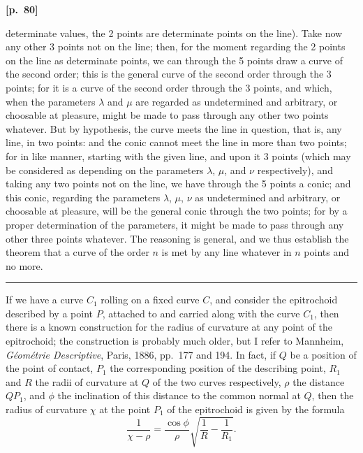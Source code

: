 \documentclass[11pt,a4paper]{book}
\begin{document}
\vspace{0.5em}
\noindent\textbf{[p.\ 80]}

determinate values, the 2 points are determinate points on the line). Take now any other 3 points not on the line; then, for the moment regarding the 2 points on the line as determinate points, we can through the 5 points draw a curve of the second order; this is the general curve of the second order through the 3 points; for it is a curve of the second order through the 3 points, and which, when the parameters $\lambda$ and $\mu$ are regarded as undetermined and arbitrary, or choosable at pleasure, might be made to pass through any other two points whatever. But by hypothesis, the curve meets the line in question, that is, any line, in two points: and the conic cannot meet the line in more than two points; for in like manner, starting with the given line, and upon it 3 points (which may be considered as depending on the parameters $\lambda$, $\mu$, and $\nu$ respectively), and taking any two points not on the line, we have through the 5 points a conic; and this conic, regarding the parameters $\lambda$, $\mu$, $\nu$ as undetermined and arbitrary, or choosable at pleasure, will be the general conic through the two points; for by a proper determination of the parameters, it might be made to pass through any other three points whatever. The reasoning is general, and we thus establish the theorem that a curve of the order $n$ is met by any line whatever in $n$ points and no more.

\vspace{1em}
\begin{center}
\rule{0.5\textwidth}{0.4pt}
\end{center}
\clearpage


\setcounter{page}{101}


If we have a curve $C_1$ rolling on a fixed curve $C$, and consider the epitrochoid described by a point $P$, attached to and carried along with the curve $C_1$, then there is a known construction for the radius of curvature at any point of the epitrochoid; the construction is probably much older, but I refer to Mannheim, \textit{G\'{e}om\'{e}trie Descriptive}, Paris, 1886, pp.~177 and 194. In fact, if $Q$ be a position of the point of contact, $P_1$ the corresponding position of the describing point, $R_1$ and $R$ the radii of curvature at $Q$ of the two curves respectively, $\rho$ the distance $QP_1$, and $\phi$ the inclination of this distance to the common normal at $Q$, then the radius of curvature $\chi$ at the point $P_1$ of the epitrochoid is given by the formula
\[
\frac{1}{\chi - \rho} = \frac{\cos\phi}{\rho}\sqrt{\frac{1}{R} - \frac{1}{R_1}}.
\]
\end{document}
